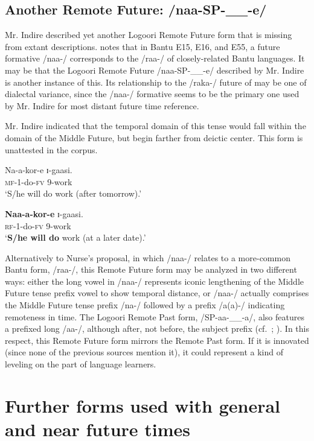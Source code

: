 \documentclass[output=paper]{langsci/langscibook}
\begin{document}
\subsection{Another Remote Future: /naa-SP-\_\_-e/}\label{sec:sarvasy:6.2}

Mr. Indire described yet another Logoori Remote Future form that is missing from extant descriptions. \citet[86, fn c]{Nurse2008} notes that in Bantu E15, E16, and E55, a future formative /naa-/ corresponds to the /raa-/ of closely-related Bantu languages. It may be that the Logoori Remote Future /naa-SP-\_\_-e/ described by Mr. Indire is another instance of this. Its relationship to the /raka-/ future of  may be one of dialectal variance, since the /naa-/ formative seems to be the primary one used by Mr. Indire for most distant future time reference.

Mr. Indire indicated that the temporal domain of this tense would fall within the domain of the Middle Future, but begin farther from deictic center. This form is unattested in the corpus.

\ea\label{ex:sarvasy:16}
\gll Na-a-kor-e  ɪ{}-gaasi. \\
\textsc{mf}{}-1-do-\textsc{fv}  9-work \\
\glt ‘S/he will do work (after tomorrow).’
\z 

\ea\label{ex:sarvasy:17}
\gll \textbf{Naa-a-kor-e}  ɪ{}-gaasi. \\
\textsc{rf}{}-1-do-\textsc{fv}  9-work \\
\glt ‘\textbf{S/he will do} work (at a later date).’
\z

Alternatively to Nurse’s proposal, in which /naa-/ relates to a more-common Bantu form, /raa-/, this Remote Future form may be analyzed in two different ways: either the long vowel in /naa-/ represents iconic lengthening of the Middle Future tense prefix vowel to show temporal distance, or /naa-/ actually comprises the Middle Future tense prefix /na-/ followed by a prefix /a(a)-/ indicating remoteness in time. The Logoori Remote Past form, /SP-aa-\_\_-a/, also features a prefixed long /aa-/, although after, not before, the subject prefix (cf.\ \citealt[206]{Mould1981}{;} \citealt[323]{Leung1991}). In this respect, this Remote Future form mirrors the Remote Past form. If it is innovated (since none of the previous sources mention it), it could represent a kind of leveling on the part of language learners.

\section[Further forms used with general and near future times]{Further forms used with general and near future times}
\label{sec:sarvasy:7}
\end{document}
